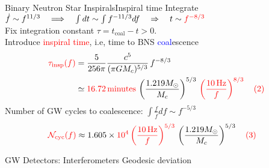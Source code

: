 \documentclass[xcolor=dvipsnames,handout,t]{beamer}
\newcommand{\red}[1]{\textcolor{red}{#1}}
\newcommand{\bl}[1]{\textcolor{blue}{#1}}
\newcommand{\f}{\frac}
\newcommand{\nn}{\nonumber}
\begin{document}
\begin{frame}{Binary Neutron Star Inspirals}{Inspiral time}
Integrate $\dot{f} \sim f^{11/3} \quad \Longrightarrow \quad \int dt \sim \int f^{-11/3}df \quad\Rightarrow\quad t \sim \red{f^{-8/3}}$
\\
\vspace{1mm}
Fix integration constant $\tau = t_\text{coal} - t >0$. \\
\vspace{2mm}
Introduce \red{inspiral time}, i.e, time to BNS \bl{coal}escence
%
\begin{align}
 \red{\tau_\text{insp}(f)} &= \f{5}{256\pi}\f{c^5}{(\pi G M_c)^{5/3}} \,{f^{-8/3}}\nn\\
 &\simeq \red{16.72\,\text{minutes}} \, \left(\f{1.219 M_\odot}{M_c}\right)^{5/3}\,\red{\left(\f{10\,\text{Hz}}{f}\right)^{8/3}\quad(2)}\nn
\end{align}
Number of GW cycles to coalescence: $\int \tfrac{f}{\dot{f}}df\sim f^{-5/3}$ %
\begin{align}
 \red{\mathcal{N}_\text{cyc}(f)} %
 &\approx 1.605\times \red{10^4 \left(\f{10\,\text{Hz}}{f} \right)^{5/3}}\,\left(\f{1.219 M_\odot}{M_c}\right)^{5/3}\quad \red{(3)}\nn
\end{align}





\end{frame}

 \begin{frame}{GW Detectors: Interferometers}
  Geodesic deviation
 \end{frame}
\end{document}
